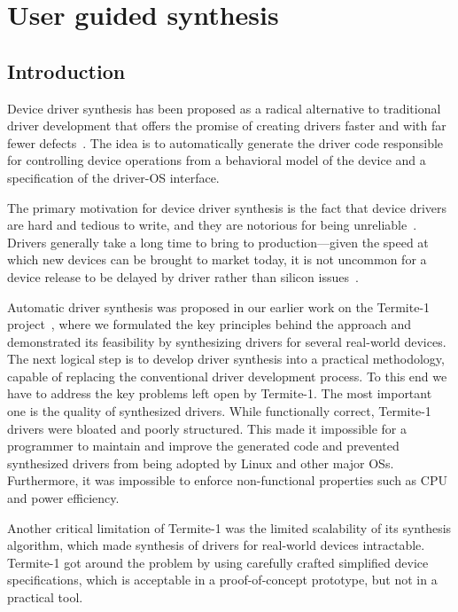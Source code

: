 \chapter{User guided synthesis}
\label{c:userguided}

\section{Introduction}\label{sec:user_guided_intro}

Device driver synthesis has been proposed as a radical alternative to traditional driver development that offers the promise of creating drivers faster and with far fewer defects~\cite{Ryzhyk_CKSH_09}. The idea is to automatically generate the driver code responsible for controlling device operations from a behavioral model of the device and a specification of the driver-OS interface.

The primary motivation for device driver synthesis is the fact that device drivers are hard and tedious to write, and they are notorious for being unreliable~\cite{Chou_YCHE_01,Ganapathi_GP_06}. Drivers generally take a long time to bring to production---given the speed at which new devices can be brought to market today, it is not uncommon for a device release to be delayed by driver rather than silicon issues~\cite{Yavatkar_12}. 

Automatic driver synthesis was proposed in our earlier work on the Termite-1 project~\cite{Ryzhyk_CKSH_09}, where we formulated the key principles behind the approach and demonstrated its feasibility by synthesizing drivers for several real-world devices.  The next logical step is to develop driver synthesis into a practical methodology, capable of replacing the conventional driver development process.  To this end we have to address the key problems left open by Termite-1.  The most important one is the quality of synthesized drivers.  While functionally correct, Termite-1 drivers were bloated and poorly structured.  This made it impossible for a programmer to maintain 
and improve the generated code and prevented synthesized drivers from being adopted by Linux and other major OSs.  Furthermore, it was impossible to enforce non-functional properties such as CPU and power efficiency.

Another critical limitation of Termite-1 was the limited scalability of its synthesis algorithm, which made synthesis of drivers for real-world devices intractable. Termite-1 got around the problem by using carefully crafted simplified device specifications, which is acceptable in a proof-of-concept prototype, but not in a practical tool.


